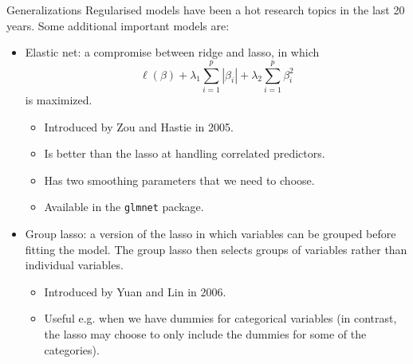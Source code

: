 \documentclass[10pt,handout]{beamer}
\begin{document}
\begin{frame}{Generalizations}
Regularised models have been a hot research topics in the last 20 years. Some additional important models are:\pause
\begin{itemize}
\item {\color{uured}Elastic net:} a compromise between ridge and lasso, in which $$\ell(\beta)+\lambda_1\sum_{i=1}^p|\beta_i|+\lambda_2\sum_{i=1}^p\beta_i^2$$ is maximized.\pause
\begin{itemize}
\item Introduced by Zou and Hastie in 2005.\pause
\item Is better than the lasso at handling correlated predictors.\pause
\item Has two smoothing parameters that we need to choose.\pause
\item Available in the \texttt{glmnet} package.\\[3mm]\pause
\end{itemize}
\item {\color{uured}Group lasso:} a version of the lasso in which variables can be grouped before fitting the model. The group lasso then selects groups of variables rather than individual variables.\pause
\begin{itemize}
\item Introduced by Yuan and Lin in 2006.\pause
\item Useful e.g. when we have dummies for categorical variables (in contrast, the lasso may choose to only include the dummies for some of the categories).
\end{itemize}
\end{itemize}
\end{frame}
\end{document}
